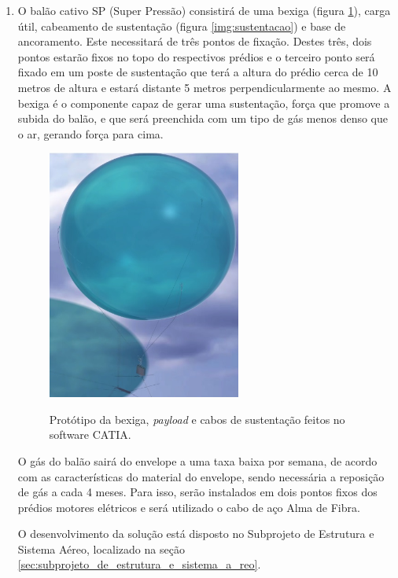 \begin{enumerate}

\item O balão cativo  SP (Super Pressão)  consistirá de uma bexiga (figura \ref{img:payload}), carga útil, cabeamento de sustentação (figura \ref{img:sustentacao}) e base de ancoramento.  Este necessitará de três pontos de fixação. Destes três, dois pontos estarão fixos no topo do respectivos prédios e o terceiro ponto será fixado em um poste de sustentação que terá a altura do prédio cerca de 10 metros de altura e estará distante 5 metros perpendicularmente ao mesmo.  A bexiga é o componente capaz de gerar uma sustentação, força que promove a subida do balão, e que será preenchida com um tipo de gás menos denso que o ar, gerando força para cima.

\begin{figure}[htp]
\centering
\caption{Protótipo da bexiga, \textit{payload} e cabos de sustentação feitos no software CATIA.}
\includegraphics[width=0.6\textwidth]{figuras/balaoRenderizado}
\label{img:payload}
\end{figure}

O gás do balão sairá do envelope a uma taxa baixa por semana, de acordo com as características do material do envelope, sendo necessária a reposição de gás a cada 4 meses. Para isso, serão instalados em dois pontos fixos dos prédios motores elétricos e será utilizado o cabo de aço Alma de Fibra.

O desenvolvimento da solução está disposto no Subprojeto de Estrutura e Sistema Aéreo, localizado na seção \ref{sec:subprojeto_de_estrutura_e_sistema_a_reo}.


\end{enumerate}
